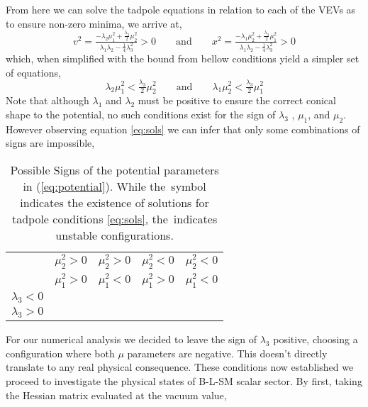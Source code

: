 % 
From here we can solve the tadpole equations in relation to each of the VEVs as to ensure non-zero minima, we arrive at,
%
\begin{equation}
	v^2 = \tfrac{-\lambda_2 \mu_1^2 + \tfrac{\lambda_3}{2}\mu_2^2}{\lambda_1 \lambda_2 - \tfrac{1}{4}\lambda_3^2} > 0
	\qquad
	\text{and}
	\qquad
	x^2 = \tfrac{-\lambda_1 \mu_2^2 + \tfrac{\lambda_3}{2}\mu_1^2}{\lambda_1 \lambda_2 - \tfrac{1}{4}\lambda_3^2} > 0 
	\label{eq:extremum}
\end{equation}
%
which, when simplified with the bound from bellow conditions yield a simpler set of equations,
%
\begin{equation}
\lambda_2 \mu_1^2 < \tfrac{\lambda_3}{2} \mu_2^2 
\qquad
\text{and}
\qquad
\lambda_1 \mu_2^2 < \tfrac{\lambda_3}{2} \mu_1^2
\label{eq:sols}
\end{equation}
%
Note that although $\lambda_1$ and $\lambda_2$ must be positive to ensure the correct {\color{blue} conical} shape to the potential, no such conditions exist for the sign of $\lambda_3$ , $\mu_1$, and $\mu_2$. However observing equation \ref{eq:sols} we can infer that only some combinations of signs are impossible, 
%
\begin{table}[H]
	\begin{center}
		\begin{tabular}{ccccc}
			& $\mu_2^2 > 0$ & $\mu_2^2 > 0$ & $\mu_2^2 < 0$ & $\mu_2^2 < 0$  	\\
			& $\mu_1^2 > 0$ & $\mu_1^2 < 0$ & $\mu_1^2 > 0$ & $\mu_1^2 < 0$  	\\        
			\hline  
			$\lambda_3 < 0 $     			    							& \xmark		& \checkmark	&	\checkmark & \checkmark	\\
			$\lambda_3 > 0$     			    							& \xmark		& \xmark	&	\xmark &  \checkmark \\
			\hline
		\end{tabular} 
		\caption{Possible Signs of the potential parameters in (\ref{eq:potential}). 
While the \checkmark\,symbol indicates the existence of solutions for tadpole conditions \eqref{eq:sols}, the \xmark\,indicates unstable configurations.}
		\label{tab:signs}  
	\end{center}
\end{table} 
%
For our numerical analysis we decided to leave the sign of $\lambda_3$ positive, choosing a configuration where both $\mu$ parameters are negative. This doesn't directly translate to any real physical consequence.  
%
These conditions now established we proceed to investigate the physical states of B-L-SM scalar sector. By first, taking the Hessian matrix evaluated at the vacuum value, 
